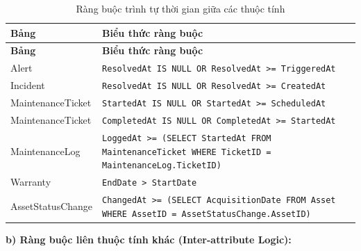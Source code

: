 \begin{longtable}{|l|p{9cm}|}
\caption{Ràng buộc trình tự thời gian giữa các thuộc tính} \label{tab:temporal_constraints} \\
\hline
\textbf{Bảng} & \textbf{Biểu thức ràng buộc} \\ \hline
\endfirsthead
\hline
\textbf{Bảng} & \textbf{Biểu thức ràng buộc} \\ \hline
\endhead
\hline
\endfoot
Alert & \texttt{ResolvedAt IS NULL OR ResolvedAt >= TriggeredAt} \\ \hline
Incident & \texttt{ResolvedAt IS NULL OR ResolvedAt >= CreatedAt} \\ \hline
MaintenanceTicket & \texttt{StartedAt IS NULL OR StartedAt >= ScheduledAt} \\ \hline
MaintenanceTicket & \texttt{CompletedAt IS NULL OR CompletedAt >= StartedAt} \\ \hline
MaintenanceLog & \texttt{LoggedAt >= (SELECT StartedAt FROM MaintenanceTicket WHERE TicketID = MaintenanceLog.TicketID)} \\ \hline
Warranty & \texttt{EndDate > StartDate} \\ \hline
AssetStatusChange & \texttt{ChangedAt >= (SELECT AcquisitionDate FROM Asset WHERE AssetID = AssetStatusChange.AssetID)} \\ \hline
\end{longtable}

\vspace{0.5em}
\noindent\textbf{b) Ràng buộc liên thuộc tính khác (Inter-attribute Logic):}

